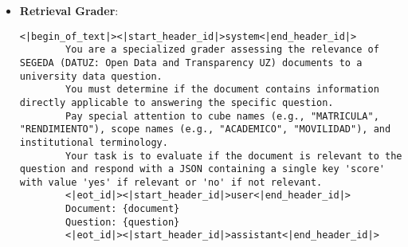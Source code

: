 \begin{itemize}
\begin{lstlisting}[breaklines=true,basicstyle=\small\ttfamily]
        Here is the document:
        <document>
        {document}
        </document>

        Here is the chunk we want to situate within the whole document:
        <chunk>
        {chunk}
        </chunk>

        Provide a concise context (2-3 sentences) for this chunk, considering the following guidelines:
        1. Identify the main topic or concept discussed in the chunk.
        2. Mention any relevant information or comparisons from the broader document context.
        3. If applicable, note how this information relates to the overall theme or purpose of the document.
        4. Include any key figures, dates, or percentages that provide important context.
        5. Do not use phrases like "This chunk discusses" or "This section provides". Instead, directly state the context.

        Your response must be in valid JSON format with a structure like this:
        {{
          "context": "Your concise context here"
        }}

        Please provide succinct context to situate this chunk within the overall document for the purposes of improving search retrieval of the chunk. Answer only with the JSON structure.
        <|eot_id|><|start_header_id|>user<|end_header_id|>
        Document: {document}
        Chunk: {chunk} 
        <|eot_id|><|start_header_id|>assistant<|end_header_id|>
    \end{lstlisting}

    \item \textbf{Retrieval Grader}:
    \begin{lstlisting}[breaklines=true,basicstyle=\small\ttfamily]
<|begin_of_text|><|start_header_id|>system<|end_header_id|> 
        You are a specialized grader assessing the relevance of SEGEDA (DATUZ: Open Data and Transparency UZ) documents to a university data question.
        You must determine if the document contains information directly applicable to answering the specific question.
        Pay special attention to cube names (e.g., "MATRICULA", "RENDIMIENTO"), scope names (e.g., "ACADEMICO", "MOVILIDAD"), and institutional terminology.
        Your task is to evaluate if the document is relevant to the question and respond with a JSON containing a single key 'score' with value 'yes' if relevant or 'no' if not relevant.
        <|eot_id|><|start_header_id|>user<|end_header_id|>
        Document: {document}
        Question: {question} 
        <|eot_id|><|start_header_id|>assistant<|end_header_id|>
    \end{lstlisting}


\end{itemize}
